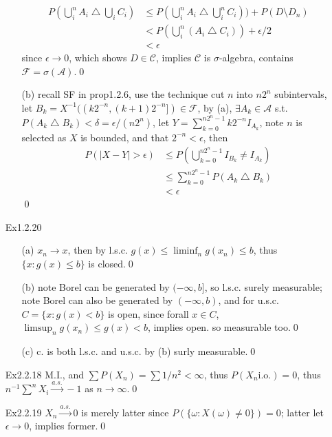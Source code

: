 \documentclass[paper=a4, fontsize=11pt]{scrartcl} %
\numberwithin{equation}{section} %
\numberwithin{figure}{section} %
\numberwithin{table}{section} %
\begin{document}
\begin{itemize}
\begin{itemize}
	 	\begin{align}
	 		P(\bigcup_i^n A_i \bigtriangleup \bigcup_i C_i) &\leq P(\bigcup_i^n A_i\bigtriangleup \bigcup_i^n C_i)) + P(D\setminus D_n)\\
	 		&< P(\bigcup_i^n (A_i\bigtriangleup  C_i)) + \epsilon/2\\
	 		&< \epsilon
	 	\end{align}
	 	since $\epsilon\rightarrow 0$, which shows $D\in \mathcal{C}$, implies $\mathcal{C}$ is $\sigma$-algebra, contains $\mathcal{F}=\sigma(\mathcal{A})$.\qed
	 	\item[(b)] recall SF in prop1.2.6, use the technique cut $n$ into $n2^n$ subintervals, let $B_k = X^{-1}((k2^{-n},(k+1)2^{-n}])\in \mathcal{F}$, by (a), $\exists A_k\in\mathcal{A}$ s.t. $P(A_k\bigtriangleup B_k)<\delta=\epsilon/(n2^n)$, let $Y=\sum_{k=0}^{n2^n-1}k2^{-n} I_{A_k}$, note $n$ is selected as $X$ is bounded, and that $2^{-n}<\epsilon$, then
	 	\begin{align}
	 		P(|X-Y|>\epsilon)&\leq P(\bigcup_{k=0}^{n2^n-1} I_{B_k}\neq I_{A_k}) \\
	 			& \leq \sum_{k=0}^{n2^n-1} P(A_k\bigtriangleup B_k)\\
	 			& <\epsilon
	 	\end{align}\qed
	 \end{itemize}
	 \item[Ex1.2.20]
	 \begin{itemize}
	 	\item[(a)] $x_n\rightarrow x$, then by l.s.c. $g(x)\leq \liminf_n g(x_n)\leq b$, thus $\{x:g(x)\leq b\}$ is closed.\qed
	 	\item[(b)] note Borel can be generated by $(-\infty,b]$, so l.s.c. surely measurable; note Borel can also be generated by $(-\infty,b)$, and for u.s.c. $C=\{x:g(x)<b\}$ is open, since forall $x\in C$, $\limsup_n g(x_n) \leq g(x)<b$, implies open. so measurable too.\qed
	 	\item[(c)] c. is both l.s.c. and u.s.c. by (b) surly measurable.\qed
	 \end{itemize}
	\item[Ex2.2.18] M.I., and $\sum P(X_n)= \sum 1/n^2 < \infty$, thus $P(X_n \text{i.o.})=0$, thus $n^{-1}\sum^n X_i \stackrel{a.s.}{\rightarrow} -1$ as $n\rightarrow \infty$.\qed
	\item[Ex2.2.19] $X_n \stackrel{a.s.}{\rightarrow} 0$ is merely latter since $P(\{\omega:X(\omega)\neq 0\})=0$; latter let $\epsilon\rightarrow 0$, implies former.\qed
\end{itemize}
\end{document}
